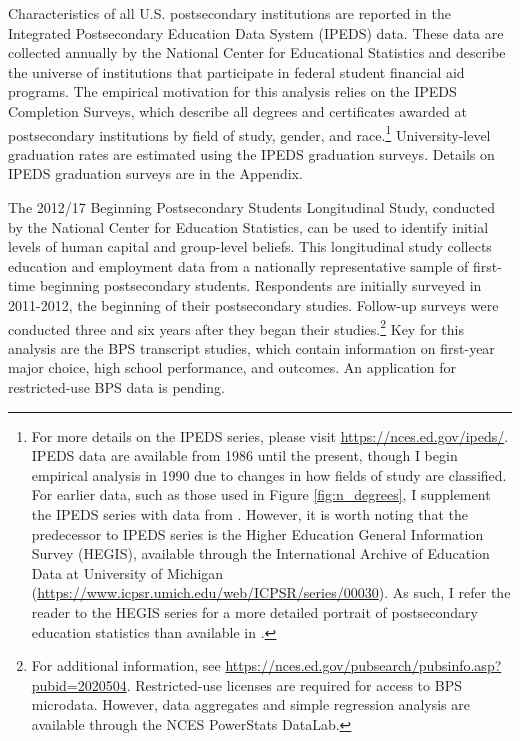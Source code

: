 \documentclass[11 pt]{article}
\begin{document}
Characteristics of all U.S. postsecondary institutions are reported in the Integrated Postsecondary Education Data System (IPEDS) data.
These data are collected annually by the National Center for Educational Statistics and describe the universe of institutions that participate in federal student financial aid programs. 
The empirical motivation for this analysis relies on the IPEDS Completion Surveys, which describe all degrees and certificates awarded at postsecondary institutions by field of study, gender, and race.\footnote{
    For more details on the IPEDS series, please visit \url{https://nces.ed.gov/ipeds/}.
    IPEDS data are available from 1986 until the present, though I begin empirical analysis in 1990 due to changes in how fields of study are classified.
    For earlier data, such as those used in Figure \ref{fig:n_degrees}, I supplement the IPEDS series with data from \textcite{S93}.
    However, it is worth noting that the predecessor to IPEDS series is the Higher Education General Information Survey (HEGIS), available through the International Archive of Education Data at University of Michigan (\url{https://www.icpsr.umich.edu/web/ICPSR/series/00030}). As such, I refer the reader to the HEGIS series for a more detailed portrait of postsecondary education statistics than available in \textcite{S93}.
}
University-level graduation rates are estimated using the IPEDS graduation surveys. 
Details on IPEDS graduation surveys are in the Appendix. 

The 2012/17 Beginning Postsecondary Students Longitudinal Study, conducted by the National Center for Education Statistics, can be used to identify initial levels of human capital and group-level beliefs. 
This longitudinal study collects education and employment data from a nationally representative sample of first-time beginning postsecondary students.
Respondents are initially surveyed in 2011-2012, the beginning of their postsecondary studies. 
Follow-up surveys were conducted three and six years after they began their studies.\footnote{
    For additional information, see \url{https://nces.ed.gov/pubsearch/pubsinfo.asp?pubid=2020504}.
    Restricted-use licenses are required for access to BPS microdata. 
    However, data aggregates and simple regression analysis are available through the NCES PowerStats DataLab. 
}
Key for this analysis are the BPS transcript studies, which contain information on first-year major choice, high school performance, and outcomes. 
An application for restricted-use BPS data is pending. 
\end{document}

